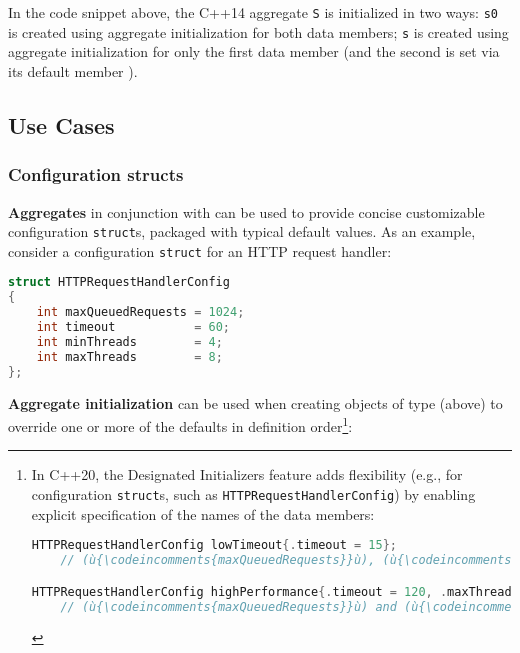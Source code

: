 \noindent In the code snippet above, the C++14 aggregate \texttt{S} is initialized
in two ways: \texttt{s0} is created using aggregate initialization for
both data members; \texttt{s} is created using aggregate
initialization for only the first data member (and the second is set via its
default member ).

\subsection[Use Cases]{Use Cases}\label{use-cases}

\subsubsection[Configuration \tt{struct}s]{Configuration {\SubsubsecCode struct}s}\label{configuration-structs}

\textbf{Aggregates} in conjunction with  can be used to provide concise customizable
configuration \texttt{struct}s, packaged with typical default values. As
an example, consider a configuration \texttt{struct} for an HTTP request
handler:

\begin{lstlisting}[language=C++]
struct HTTPRequestHandlerConfig
{
    int maxQueuedRequests = 1024;
    int timeout           = 60;
    int minThreads        = 4;
    int maxThreads        = 8;
};
\end{lstlisting}

\noindent \textbf{Aggregate initialization} can be used when creating objects of
type  (above) to override one or more
of the defaults in definition order{\cprotect\footnote{In C++20, the
Designated Initializers feature adds flexibility (e.g., for
configuration \texttt{struct}s, such as
\texttt{HTTPRequestHandlerConfig}) by enabling explicit specification
of the names of the data members:

\begin{lstlisting}[language=C++, basicstyle={\ttfamily\footnotesize}]
HTTPRequestHandlerConfig lowTimeout{.timeout = 15};
    // (ù{\codeincomments{maxQueuedRequests}}ù), (ù{\codeincomments{minThreads}}ù), and (ù{\codeincomments{maxThreads}}ù) have their default value.

HTTPRequestHandlerConfig highPerformance{.timeout = 120, .maxThreads = 16};
    // (ù{\codeincomments{maxQueuedRequests}}ù) and (ù{\codeincomments{minThreads}}ù) have their default value.
\end{lstlisting}
      }}:

